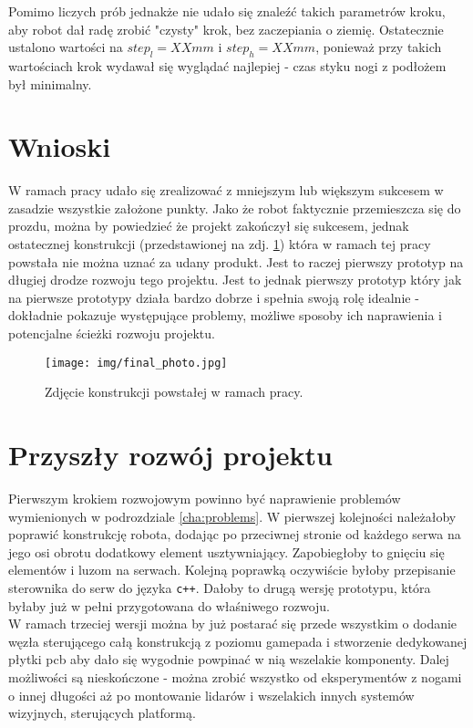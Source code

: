 Pomimo liczych prób jednakże nie udało się znaleźć takich parametrów kroku, aby robot dał radę zrobić "czysty" krok, bez zaczepiania o ziemię. Ostatecznie ustalono wartości na $step_l = XXmm$ i $step_h = XXmm$, ponieważ przy takich wartościach krok wydawał się wyglądać najlepiej - czas styku nogi z podłożem był minimalny.

\section{Wnioski}
W ramach pracy udało się zrealizować z mniejszym lub większym sukcesem w zasadzie wszystkie założone punkty. Jako że robot faktycznie przemieszcza się do prozdu, można by powiedzieć że projekt zakończył się sukcesem, jednak ostatecznej konstrukcji (przedstawionej na zdj. \ref{img:final_photo}) która w ramach tej pracy powstała nie można uznać za udany produkt. Jest to raczej pierwszy prototyp na długiej drodze rozwoju tego projektu. Jest to jednak pierwszy prototyp który jak na pierwsze prototypy działa bardzo dobrze i spełnia swoją rolę idealnie - dokładnie pokazuje występujące problemy, możliwe sposoby ich naprawienia i potencjalne ścieżki rozwoju projektu.

\begin{figure}[h!]
\texttt{[image: img/final\_photo.jpg]}
\centering
\caption{Zdjęcie konstrukcji powstałej w ramach pracy.}
\label{img:final_photo}
\end{figure}

\section{Przyszły rozwój projektu}
Pierwszym krokiem rozwojowym powinno być naprawienie problemów wymienionych w podrozdziale \ref{cha:problems}. W pierwszej kolejności należałoby poprawić konstrukcję robota, dodając po przeciwnej stronie od każdego serwa na jego osi obrotu dodatkowy element usztywniający. Zapobiegłoby to gnięciu się elementów i luzom na serwach. Kolejną poprawką oczywiście byłoby przepisanie sterownika do serw do języka \texttt{c++}. Dałoby to drugą wersję prototypu, która byłaby już w pełni przygotowana do właśniwego rozwoju.\\

W ramach trzeciej wersji można by już postarać się przede wszystkim o dodanie węzła sterującego całą konstrukcją z poziomu gamepada i stworzenie dedykowanej płytki pcb aby dało się wygodnie powpinać w nią wszelakie komponenty. Dalej możliwości są nieskończone - można zrobić wszystko od eksperymentów z nogami o innej długości aż po montowanie lidarów i wszelakich innych systemów wizyjnych, sterujących platformą.
